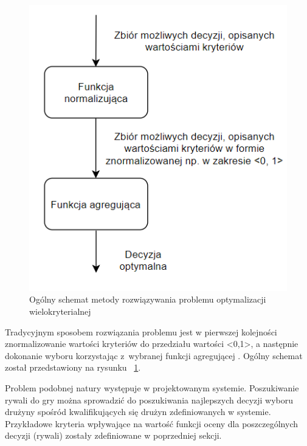 \begin{figure}[ht]
\centering
\includegraphics[width=0.5\linewidth]{03-koncept/rys/tradycyjne-algorytmy-opt.PNG}
\caption{Ogólny schemat metody rozwiązywania problemu optymalizacji wielokryterialnej}
\label{fig:diagram-trad-alg-opt}
\end{figure}

Tradycyjnym sposobem rozwiązania problemu jest w pierwszej kolejności znormalizowanie wartości kryteriów do przedziału wartości <0,1>, a następnie dokonanie wyboru korzystając z~wybranej funkcji agregującej \cite{optwielok}. Ogólny schemat został przedstawiony na rysunku ~\ref{fig:diagram-trad-alg-opt}.

Problem podobnej natury występuje w projektowanym systemie. Poszukiwanie rywali do gry można sprowadzić do poszukiwania najlepszych decyzji wyboru drużyny spośród kwalifikujących się drużyn zdefiniowanych w systemie. Przykładowe kryteria wpływające na wartość funkcji oceny dla poszczególnych decyzji (rywali) zostały zdefiniowane w poprzedniej sekcji.

